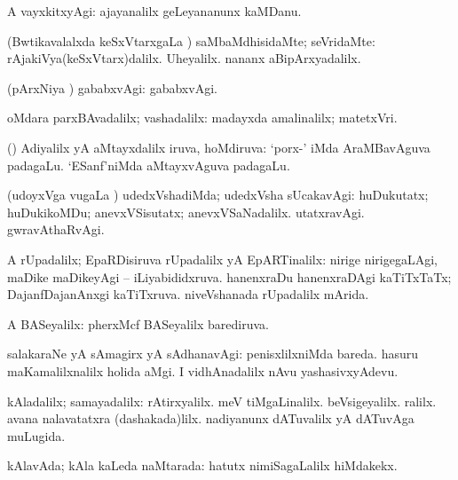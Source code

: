 {{ 
 A vayxkitxyAgi:  ajayanalilx geLeyananunx kaMDanu. 

 
 (Bwtikavalalxda keSxVtarxgaLa \vi) saMbaMdhisidaMte; seVridaMte:
 rAjakiVya(keSxVtarx)dalilx.  Uheyalilx.
 nananx aBipArxyadalilx. 

 
 (pArxNiya \vi)
gababxvAgi:  gababxvAgi. 

 
 oMdara parxBAvadalilx;
vashadalilx:  madayxda amalinalilx; matetxVri. 

 
 (\vAyx) Adiyalilx yA aMtayxdalilx iruva, hoMdiruva:  `porx-' iMda AraMBavAguva padagaLu.  `ESanf'niMda
aMtayxvAguva padagaLu. 

 
 (udoyxVga \mo vugaLa \vi) udedxVshadiMda;
udedxVsha sUcakavAgi:  huDukutatx; huDukikoMDu;
anevxVSisutatx; anevxVSaNadalilx. 
utatxravAgi.  gwravAthaRvAgi.
 
 A rUpadalilx; EpaRDisiruva rUpadalilx yA EpARTinalilx:
  nirige nirigegaLAgi, maDike maDikeyAgi --
 iLiyabididxruva.  hanenxraDu hanenxraDAgi
 kaTiTxTaTx; DajanfDajanAnxgi kaTiTxruva.  niveVshanada rUpadalilx mArida.

 
 A BASeyalilx:  pherxMcf BASeyalilx barediruva. 

 
 salakaraNe yA sAmagirx yA sAdhanavAgi:  penisxlilxniMda bareda.  hasuru
 maKamalilxnalilx holida aMgi.  I
 vidhAnadalilx nAvu yashasivxyAdevu. 

 
 kAladalilx; samayadalilx:  rAtirxyalilx. 
meV tiMgaLinalilx.  beVsigeyalilx. ralilx.  avana nalavatatxra
(dashakada)lilx.  nadiyanunx dATuvalilx yA dATuvAga muLugida. 

 
 kAlavAda; kAla kaLeda naMtarada: 
 hatutx nimiSagaLalilx hiMdakekx.

}}
